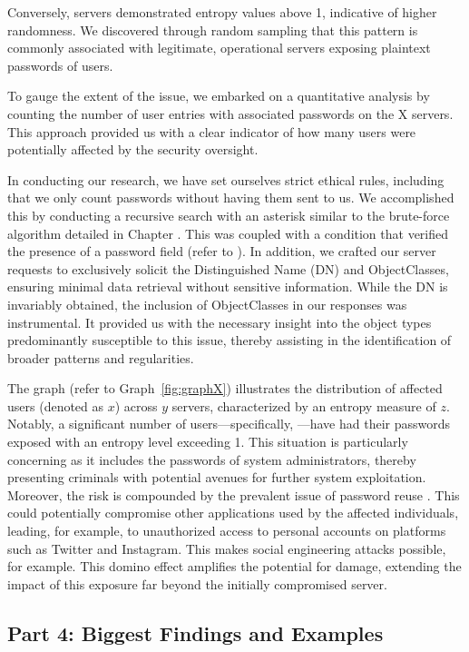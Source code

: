 Conversely,  servers demonstrated entropy values above 1, indicative of higher randomness. We discovered through random sampling that this pattern is commonly associated with legitimate, operational servers exposing plaintext passwords of users. 

To gauge the extent of the issue, we embarked on a quantitative analysis by counting the number of user entries with associated passwords on the X servers. This approach provided us with a clear indicator of how many users were potentially affected by the security oversight.

In conducting our research, we have set ourselves strict ethical rules, including that we only count passwords without having them sent to us. We accomplished this by conducting a recursive search with an asterisk similar to the brute-force algorithm detailed in Chapter . This was coupled with a condition that verified the presence of a password field (refer to ). In addition, we crafted our server requests to exclusively solicit the Distinguished Name (DN) and ObjectClasses, ensuring minimal data retrieval without sensitive information. While the DN is invariably obtained, the inclusion of ObjectClasses in our responses was instrumental. It provided us with the necessary insight into the object types predominantly susceptible to this issue, thereby assisting in the identification of broader patterns and regularities.

The graph (refer to Graph~\ref{fig:graphX}) illustrates the distribution of affected users (denoted as $x$) across $y$ servers, characterized by an entropy measure of $z$. Notably, a significant number of users---specifically, ---have had their passwords exposed with an entropy level exceeding 1. This situation is particularly concerning as it includes the passwords of system administrators, thereby presenting criminals with potential avenues for further system exploitation. Moreover, the risk is compounded by the prevalent issue of password reuse . This could potentially compromise other applications used by the affected individuals, leading, for example, to unauthorized access to personal accounts on platforms such as Twitter and Instagram. This makes social engineering attacks possible, for example. This domino effect amplifies the potential for damage, extending the impact of this exposure far beyond the initially compromised server.

\subsection{Part 4: Biggest Findings and Examples}

